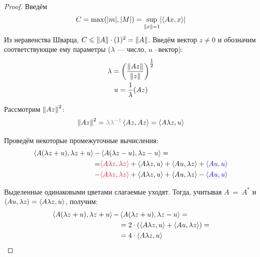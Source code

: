 \documentclass[12pt]{article}
\begin{document}
	\begin{proof}
		Введём 
		$$C = \max(|m|, |M|) = \underset{\left\| x \right\| = 1}{\sup} |\!\left\langle Ax, x \right\rangle\!|$$
		Из неравенства Шварца, $C \leqslant \left\| A \right\| \cdot (1)^2 = \left\| A \right\|$.
		Введём вектор $z \neq 0$ и обозначим соответствующие ему параметры ($\lambda$ --- число, $u$ --вектор):
		\begin{gather*}
			\lambda = \left(\frac{\left\| Az \right\|}{\left\| z \right\|}\right)^{\tfrac{1}{2}} \\
			u = \frac{1}{\lambda}(Az)
		\end{gather*}
		
		Рассмотрим $\left\| Az \right\|^2$:
		\begin{equation} \label{eq:scalprod}
			\norm{Az}^2 = {\color{gray} \lambda\lambda^{-1}} \scal{Az}{Az} = \scal{A \lambda z}{u}
		\end{equation}
		
		Проведём некоторые промежуточные вычисления:
		\begin{equation*}
		\begin{split}
			\left\langle A(\lambda z + u), \lambda z + u \right\rangle - &\left\langle A(\lambda z - u), \lambda z - u \right\rangle = \\
			  = &{\color{red}\left\langle A \lambda z, \lambda z \right\rangle} + \left\langle A\lambda z, u \right\rangle + \left\langle Au, \lambda z \right\rangle + {\color{blue}\left\langle Au, u \right\rangle} \\
			  - &{\color{red}\left\langle A \lambda z, \lambda z \right\rangle} + \left\langle A\lambda z, u \right\rangle + \left\langle Au, \lambda z \right\rangle - {\color{blue}\left\langle Au, u \right\rangle}
		\end{split}
		\end{equation*}
		
		Выделенные одинаковыми цветами слагаемые уходят. Тогда, учитывая $A~=~A^{*}$ и 
		$\left\langle Au, \lambda z \right\rangle = \left\langle A\lambda z, u \right\rangle$, получим:
		\begin{equation} \label{eq:scalproddiff}
		\begin{split}
			\left\langle A(\lambda z + u), \lambda z + u \right\rangle - &\left\langle A(\lambda z + u), \lambda z - u \right\rangle = \\
			 &= 2 \cdot \left(\left\langle A\lambda z, u \right\rangle + \left\langle Au, \lambda z \right\rangle\right) = \\
			 &= 4 \cdot \left\langle A\lambda z, u \right\rangle
		\end{split}
		\end{equation}
		

\end{proof}
\end{document}
